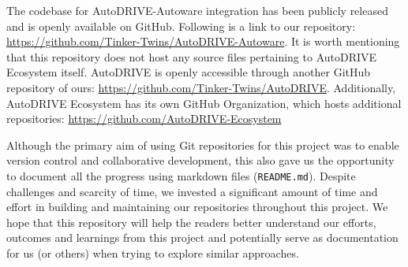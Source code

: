 The codebase for AutoDRIVE-Autoware integration has been publicly released and is openly available on GitHub. Following is a link to our repository: \href{https://github.com/Tinker-Twins/AutoDRIVE-Autoware}{https://github.com/Tinker-Twins/AutoDRIVE-Autoware}. It is worth mentioning that this repository does not host any source files pertaining to AutoDRIVE Ecosystem itself. AutoDRIVE is openly accessible through another GitHub repository of ours: \href{https://github.com/Tinker-Twins/AutoDRIVE}{https://github.com/Tinker-Twins/AutoDRIVE}. Additionally, AutoDRIVE Ecosystem has its own GitHub Organization, which hosts additional repositories: \href{https://github.com/AutoDRIVE-Ecosystem}{https://github.com/AutoDRIVE-Ecosystem}

Although the primary aim of using Git repositories for this project was to enable version control and collaborative development, this also gave us the opportunity to document all the progress using markdown files (\texttt{README.md}). Despite challenges and scarcity of time, we invested a significant amount of time and effort in building and maintaining our repositories throughout this project. We hope that this repository will help the readers better understand our efforts, outcomes and learnings from this project and potentially serve as documentation for us (or others) when trying to explore similar approaches.
